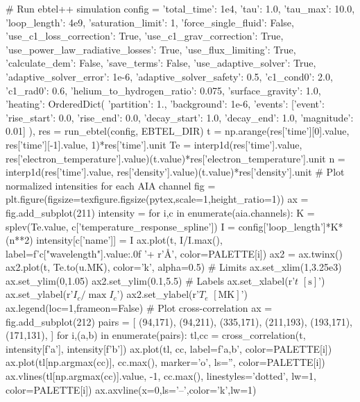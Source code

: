 \begin{pycode}
# Run ebtel++ simulation
config = {
    'total_time': 1e4,
    'tau': 1.0,
    'tau_max': 10.0,
    'loop_length': 4e9,
    'saturation_limit': 1,
    'force_single_fluid': False,
    'use_c1_loss_correction': True,
    'use_c1_grav_correction': True,
    'use_power_law_radiative_losses': True,
    'use_flux_limiting': True,
    'calculate_dem': False,
    'save_terms': False,
    'use_adaptive_solver': True,
    'adaptive_solver_error': 1e-6,
    'adaptive_solver_safety': 0.5,
    'c1_cond0': 2.0,
    'c1_rad0': 0.6,
    'helium_to_hydrogen_ratio': 0.075,
    'surface_gravity': 1.0,
    'heating': OrderedDict({
        'partition': 1.,
        'background': 1e-6,
        'events': [{'event': {'rise_start': 0.0,
                                'rise_end': 0.0,
                                'decay_start': 1.0,
                                'decay_end': 1.0, 
                                'magnitude': 0.01}}]
    }),
}
res = run_ebtel(config, EBTEL_DIR)
t = np.arange(res['time'][0].value, res['time'][-1].value, 1)*res['time'].unit
Te = interp1d(res['time'].value, res['electron_temperature'].value)(t.value)*res['electron_temperature'].unit
n = interp1d(res['time'].value, res['density'].value)(t.value)*res['density'].unit
# Plot normalized intensities for each AIA channel
fig = plt.figure(figsize=texfigure.figsize(pytex,scale=1,height_ratio=1))
ax = fig.add_subplot(211)
intensity = {}
for i,c in enumerate(aia.channels):
    K = splev(Te.value, c['temperature_response_spline'])
    I = config['loop_length']*K*(n**2)
    intensity[c['name']] = I
    ax.plot(t, I/I.max(),
            label=f'{c["wavelength"].value:.0f} '+ r'$\si{\angstrom}$',
            color=PALETTE[i])
ax2 = ax.twinx()
ax2.plot(t, Te.to(u.MK), color='k', alpha=0.5)
# Limits
ax.set_xlim(1,3.25e3)
ax.set_ylim(0,1.05)
ax2.set_ylim(0.1,5.5)
# Labels
ax.set_xlabel(r'$t$ $[\si{\second}]$')
ax.set_ylabel(r'$I_c/\max{I_c}$')
ax2.set_ylabel(r'$T_e$ $[\si{\mega\kelvin}]$')
ax.legend(loc=1,frameon=False)
# Plot cross-correlation
ax = fig.add_subplot(212)
pairs = [
    (94,171),
    (94,211),
    (335,171),
    (211,193),
    (193,171),
    (171,131),
]
for i,(a,b) in enumerate(pairs):
    tl,cc = cross_correlation(t, intensity[f'{a}'], intensity[f'{b}'])
    ax.plot(tl, cc, label=f'{a},{b}', color=PALETTE[i])
    ax.plot(tl[np.argmax(cc)], cc.max(), marker='o', ls='', color=PALETTE[i])
    ax.vlines(tl[np.argmax(cc)].value, -1, cc.max(), linestyles='dotted', lw=1, color=PALETTE[i])
ax.axvline(x=0,ls='--',color='k',lw=1)

\end{pycode}
